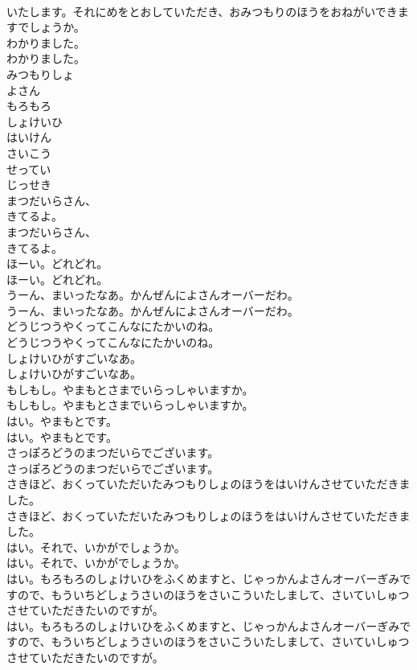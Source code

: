 \documentclass[8pt]{extreport}
\begin{document}
\begin{CJK}{UTF8}{min}
\\	いたします。それにめをとおしていただき、おみつもりのほうをおねがいできますでしょうか。
\\	わかりました。
\\	わかりました。
\\	みつもりしょ
\\	よさん
\\	もろもろ
\\	しょけいひ
\\	はいけん
\\	さいこう
\\	せってい
\\	じっせき
\\	まつだいらさん、
\\	きてるよ。
\\	まつだいらさん、
\\	きてるよ。
\\	ほーい。どれどれ。
\\	ほーい。どれどれ。
\\	うーん、まいったなあ。かんぜんによさんオーバーだわ。
\\	うーん、まいったなあ。かんぜんによさんオーバーだわ。
\\	どうじつうやくってこんなにたかいのね。
\\	どうじつうやくってこんなにたかいのね。
\\	しょけいひがすごいなあ。
\\	しょけいひがすごいなあ。
\\	もしもし。やまもとさまでいらっしゃいますか。
\\	もしもし。やまもとさまでいらっしゃいますか。
\\	はい。やまもとです。
\\	はい。やまもとです。
\\	さっぽろどうのまつだいらでございます。
\\	さっぽろどうのまつだいらでございます。
\\	さきほど、おくっていただいたみつもりしょのほうをはいけんさせていただきました。
\\	さきほど、おくっていただいたみつもりしょのほうをはいけんさせていただきました。
\\	はい。それで、いかがでしょうか。
\\	はい。それで、いかがでしょうか。
\\	はい。もろもろのしょけいひをふくめますと、じゃっかんよさんオーバーぎみですので、もういちどしょうさいのほうをさいこういたしまして、さいていしゅつさせていただきたいのですが。
\\	はい。もろもろのしょけいひをふくめますと、じゃっかんよさんオーバーぎみですので、もういちどしょうさいのほうをさいこういたしまして、さいていしゅつさせていただきたいのですが。

\end{CJK}
\end{document}
